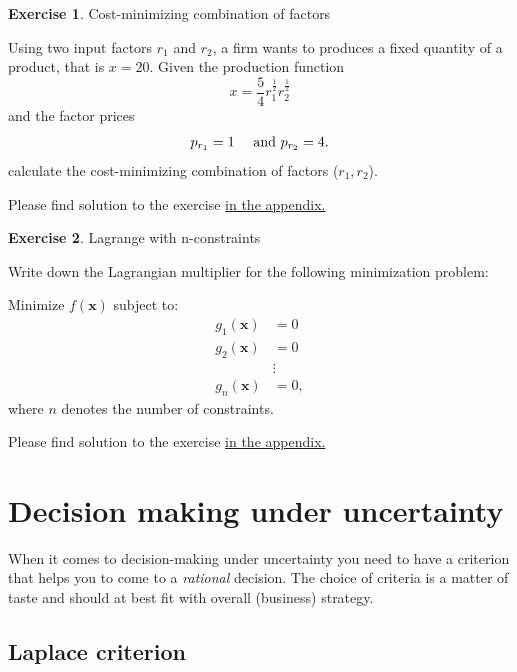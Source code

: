 \documentclass[
  12pt,
  oneside]{book}
\theoremstyle{definition}
\theoremstyle{definition}
\theoremstyle{definition}
\newtheorem{exercise}{Exercise}[chapter]
\theoremstyle{definition}
\theoremstyle{remark}
\begin{document}
\begin{exercise}
\protect\hypertarget{exr:costmin}{}\label{exr:costmin}Cost-minimizing combination of factors

Using two input factors \(r_1\) and \(r_2\), a firm wants to produces a fixed quantity of a product, that is \(x=20\). Given the production function
\[
    x=\frac{5}{4} r_1^{\frac{1}{2}} r_2^{\frac{1}{2}}
    \] and the factor prices
\[
    p_{r_1}=1 \quad \textnormal{ and } p_{r_2}=4.
    \]
calculate the cost-minimizing combination of factors (\(r_1, r_2\)).

Please find solution to the exercise \protect\hyperlink{sol:costmin}{in the appendix.}
\end{exercise}

\begin{exercise}
\protect\hypertarget{exr:lagrcons}{}\label{exr:lagrcons}Lagrange with n-constraints

Write down the Lagrangian multiplier for the following minimization problem:

Minimize \(f(\mathbf{x})\) subject to:
\[\begin{aligned}
    g_1(\mathbf{x})&=0 \\
    g_2(\mathbf{x})&=0\\
    &\vdots\\
    g_n(\mathbf{x})&=0,\end{aligned}\]
where \(n\) denotes the number of constraints.
\end{exercise}

Please find solution to the exercise \protect\hyperlink{sol:lagrcons}{in the appendix.}

\hypertarget{decision-making-under-uncertainty}{%
\section{Decision making under uncertainty}\label{decision-making-under-uncertainty}}

When it comes to decision-making under uncertainty you need to have a criterion that helps you to come to a \emph{rational} decision. The choice of criteria is a matter of taste and should at best fit with overall (business) strategy.

\hypertarget{laplace-criterion}{%
\subsection*{Laplace criterion}\label{laplace-criterion}}
\end{document}
